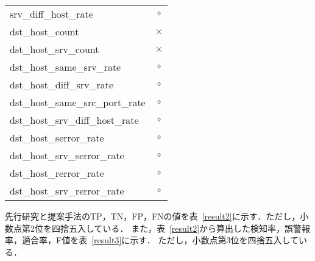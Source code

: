 \begin{table}[htbp]
\begin{tabular}{|l|c|}
        srv\_diff\_host\_rate & \(\circ\) \\
        dst\_host\_count & \(\times\) \\
        dst\_host\_srv\_count & \(\times\) \\
        dst\_host\_same\_srv\_rate & \(\circ\) \\
        dst\_host\_diff\_srv\_rate & \(\circ\) \\
        dst\_host\_same\_src\_port\_rate & \(\circ\) \\
        dst\_host\_srv\_diff\_host\_rate & \(\circ\) \\
        dst\_host\_serror\_rate & \(\circ\) \\
        dst\_host\_srv\_serror\_rate & \(\circ\) \\
        dst\_host\_rerror\_rate & \(\circ\) \\
        dst\_host\_srv\_rerror\_rate & \(\circ\) \\
        \hline
    \end{tabular}
\end{table}
  先行研究と提案手法のTP，TN，FP，FNの値を表~\ref{result2}に示す．ただし，小数点第2位を四捨五入している．
また，表~\ref{result2}から算出した検知率，誤警報率，適合率，F値を表~\ref{result3}に示す．
ただし，小数点第3位を四捨五入している．


